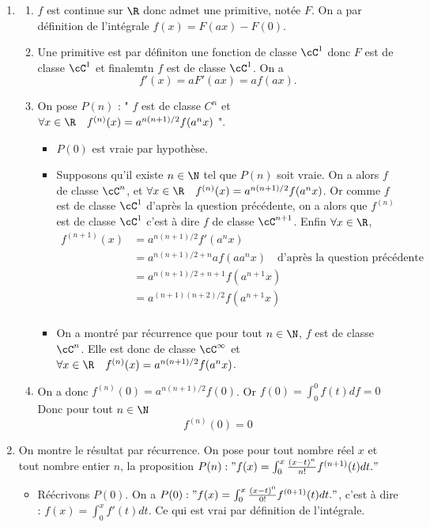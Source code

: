 \begin{correction}
\begin{enumerate}
\item 
\begin{enumerate}
\item $f$ est continue sur $\R$ donc admet une primitive, notée $F$. On a 
par définition de l'intégrale $f(x) = F(ax) - F(0)$. 
\item Une primitive est par définiton une fonction de classe $\cC^1$ donc $F$ est de classe $\cC^1$ et finalemtn $f$ est de classe $\cC^1$. On a 
$$f'(x) = a F'(ax) = af(ax).$$ 
\item On pose $P(n)$ : " $f$ est de classe $C^n$ et $\forall x\in \R \quad  f^{(n)} (x) =a^{n(n+1)/2} f(a^nx)$ ".
\begin{itemize}
\item $P(0)$ est vraie par hypothèse. 
\item Supposons qu'il existe $n\in \N$ tel que $P(n)$ soit vraie. On a alors $f$ de classe $\cC^n$, et $\forall x\in \R \quad  f^{(n)} (x) =a^{n(n+1)/2} f(a^nx)$. 
Or comme $f$ est de classe $\cC^1$ d'après la question précédente, on a alors que $ f^{(n)}$ est de classe $\cC^1$ c'est à dire $f$ de classe $\cC^{n+1}$. Enfin 
$\forall x\in \R$,   \begin{align*}
 f^{(n+1)} (x) &= a^{n(n+1)/2}  f'(a^nx)\\ 
 						&= a^{n(n+1)/2+n} a f(a a^n x) \quad \text{d'après la question précédente}\\
 						&= a^{n(n+1)/2+n+1} f(a^{n+1} x) \\
 						&= a^{(n+1)(n+2)/2} f(a^{n+1} x) \\
\end{align*} 
\item On a montré par récurrence que pour tout $n\in \N$, $f$ est de classe $\cC^n$. Elle est donc de classe $\cC^\infty$ et $\forall x\in \R \quad  f^{(n)} (x) =a^{n(n+1)/2} f(a^nx)$.
\end{itemize}
\item  On a donc $f^{(n)} (0) = a^{n(n+1)/2 } f(0) $. Or $f(0) = \int_0^{0} f(t)df =0$
Donc pour tout $n\in \N$ $$f^{(n)} (0) =0$$
\end{enumerate}
\item On montre le résultat par récurrence. On pose pour tout nombre réel $x$ et tout nombre entier $n$, la proposition 
$P(n) : "f(x) = \int_0^x \frac{(x-t)^n}{n!} f^{(n+1)} (t) dt."$
\begin{itemize}
\item Réécrivons $P(0)$. On a $P(0) : "f(x) = \int_0^x \frac{(x-t)^0}{0!} f^{(0+1)} (t) dt. " $, c'est à dire : $f(x) = \int_0^x  f'(t) dt.$ Ce qui est vrai par définition de l'intégrale. 

\end{itemize}
\end{enumerate}
\end{correction}

